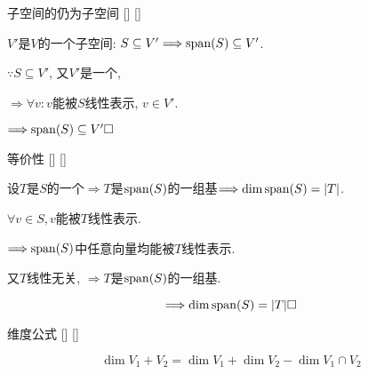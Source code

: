 \documentclass[UTF8]{ctexart}
\begin{document}
		\begin{ppt}
			[]
			{子空间的 仍为子空间}
			[]
			[]

			$V'$是$V$的一个子空间: $S\subseteq V'\Longrightarrow{\rm span}(S)\subseteq V'$. 
		\end{ppt}
  
		\begin{prf}
			
			$\because S\subseteq V'$, 又$V'$是一个, 
			
			$\Longrightarrow \forall v: v$能被$S$线性表示, $v\in V'$. 
			
			$\Longrightarrow {\rm span}(S)\subseteq V' \square$
        \end{prf}
		
		\begin{ppt}
			[]
			{等价性}
			[]
			[]

			设$T$是$S$的一个$\Longrightarrow T$是${\rm span}(S)$的一组基$\Longrightarrow\dim {\rm span}(S)=|T|$. 
		\end{ppt}
  
        \begin{prf}
			
			$\forall v\in S, v$能被$T$线性表示. 
			
			$\Longrightarrow {\rm span}(S)$中任意向量均能被$T$线性表示. 
			
			又$T$线性无关, $\Longrightarrow T$是${\rm span}(S)$的一组基. 
			
			$$\Longrightarrow \dim{\rm span}(S)=|T|\square$$
        \end{prf}
		
		\begin{thm}
			[]
			{ 维度公式}
			[]
			[]

			$$\dim V_{1}+V_{2}=\dim V_{1}+\dim V_{2}-\dim V_{1}\cap V_{2}$$
		\end{thm}
\end{document}
